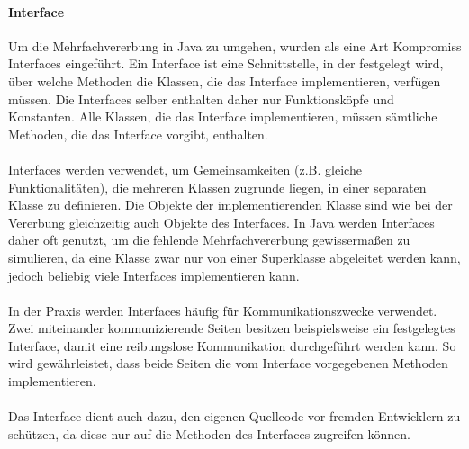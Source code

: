 \paragraph{Interface}
Um die Mehrfachvererbung in Java zu umgehen, wurden als eine Art Kompromiss Interfaces eingeführt. Ein Interface ist eine Schnittstelle, in der festgelegt wird, über welche Methoden die Klassen, die das Interface implementieren, verfügen müssen. Die Interfaces selber enthalten daher nur Funktionsköpfe und Konstanten. Alle Klassen, die das Interface implementieren, müssen sämtliche Methoden, die das Interface vorgibt, enthalten.\\
\\
Interfaces werden verwendet, um Gemeinsamkeiten (z.B. gleiche Funktionalitäten), die mehreren Klassen zugrunde liegen, in einer separaten Klasse zu definieren. Die Objekte der implementierenden Klasse sind wie bei der Vererbung gleichzeitig auch Objekte des Interfaces. In Java werden Interfaces daher oft genutzt, um die fehlende Mehrfachvererbung gewissermaßen zu simulieren, da eine Klasse zwar nur von einer Superklasse abgeleitet werden kann, jedoch beliebig viele Interfaces implementieren kann.\\
\\
In der Praxis werden Interfaces häufig für Kommunikationszwecke verwendet. Zwei miteinander kommunizierende Seiten besitzen beispielsweise ein festgelegtes Interface, damit eine reibungslose Kommunikation durchgeführt werden kann. So wird gewährleistet, dass beide Seiten die vom Interface vorgegebenen Methoden implementieren.\\
\\
Das Interface dient auch dazu, den eigenen Quellcode vor fremden Entwicklern zu schützen, da diese nur auf die Methoden des Interfaces zugreifen können.